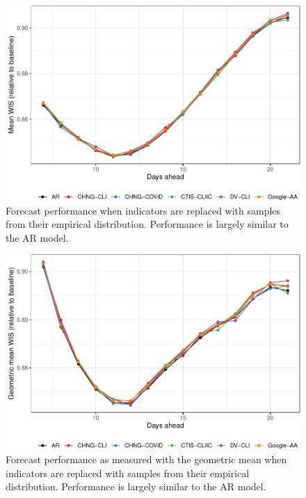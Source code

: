 \begin{figure}

{\centering \includegraphics[width=\textwidth]{fig/fcast-booted-1} 

}

\caption{Forecast performance when indicators are replaced with samples from their empirical distribution. Performance is largely similar to the AR model.}\label{fig:fcast-booted}
\end{figure}

\clearpage

\begin{figure}

{\centering \includegraphics[width=\textwidth]{fig/fcast-booted-adjusted-1} 

}

\caption{Forecast performance as measured with the geometric mean when indicators are replaced with samples from their empirical distribution. Performance is largely similar to the AR model.}\label{fig:fcast-booted-adjusted}
\end{figure}

